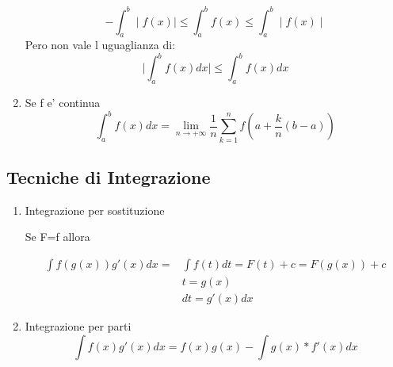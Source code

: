 \documentclass{article}
\begin{document}
\begin{flushleft}
\begin{enumerate}
\begin{equation}
                -\int_a^b \mid f(x) \mid \leq \int_a^b f(x) \leq \int_a^b \mid f(x) \mid 
              \end{equation}
              Pero non vale l uguaglianza di:
              \begin{equation}
                \mid \int_a^b f(x)dx \mid \leq \int_a^b f(x)dx
              \end{equation}
            \item Se f e' continua 
              \begin{equation}
                \int_a^b f(x)dx = \lim_{n \to +\infty} \frac{1}{n} \sum_{k=1}^n f(a+ \frac{k}{n}(b-a))
              \end{equation}
          \end{enumerate}
        \end{flushleft}
        \subsection{Tecniche di Integrazione}
          \begin{enumerate}
            \item Integrazione per sostituzione
              \begin{flushleft}
                Se F=f allora
              \end{flushleft}
              \begin{equation}
                \begin{split}
                  \int f(g(x))g'(x)dx= & \int f(t) dt=F(t)+c=F(g(x))+c \\ 
                  & t=g(x) \\ 
                  & dt=g'(x)dx
                \end{split}
              \end{equation}
            \item Integrazione per parti
                \begin{equation}
                  \int f(x)g'(x)dx=f(x)g(x)-\int g(x)*f'(x)dx
                \end{equation}
          \end{enumerate}
\end{document}
